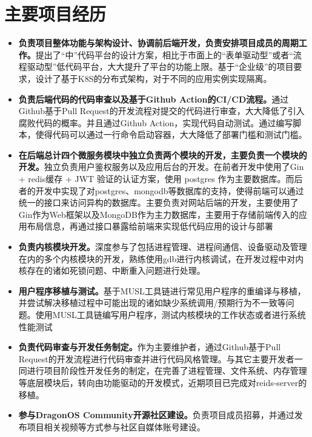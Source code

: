 \documentclass{resume}
\begin{document}
\section{主要项目经历}
\begin{itemize}
  \item \textbf{负责项目整体功能与架构设计、协调前后端开发，负责安排项目成员的周期工作。}提出了“中”代码平台的设计方案，相比于市面上的“表单驱动型”或者“流程驱动型”低代码平台，大大提升了平台的功能上限。基于“企业级”的项目要求，设计了基于K8S的分布式架构，对于不同的应用实例实现隔离。
  \item \textbf{负责后端代码的代码审查以及基于Github Action的CI/CD流程。}通过Github基于Pull Request的开发流程对提交的代码进行审查，大大降低了引入腐败代码的概率。并且通过Github Action，实现代码自动测试。通过编写脚本，使得代码可以通过一行命令启动容器，大大降低了部署门槛和测试门槛。
  \item \textbf{在后端总计四个微服务模块中独立负责两个模块的开发，主要负责一个模块的开发。}独立负责用户鉴权服务以及应用后台的开发。在前者开发中使用了Gin + redis缓存 + JWT 验证的认证方案，使用 postgres 作为主要数据库。而后者的开发中实现了对postgres、mongodb等数据库的支持，使得前端可以通过统一的接口来访问异构的数据库。主要负责对网站后端的开发，主要使用了Gin作为Web框架以及MongoDB作为主力数据库，主要用于存储前端传入的应用布局信息，再通过接口暴露给前端来实现低代码应用的设计与部署
\end{itemize}

\begin{itemize}
  \item \textbf{负责内核模块开发。}深度参与了包括进程管理、进程间通信、设备驱动及管理在内的多个内核模块的开发，熟练使用gdb进行内核调试，在开发过程中对内核存在的诸如死锁问题、中断重入问题进行处理。
  \item \textbf{用户程序移植与测试。}基于MUSL工具链进行常见用户程序的重编译与移植，并尝试解决移植过程中可能出现的诸如缺少系统调用/预期行为不一致等问题。使用MUSL工具链编写用户程序，测试内核模块的工作状态或者进行系统性能测试
  \item \textbf{负责代码审查与开发任务制定。}作为主要维护者，通过Github基于Pull Request的开发流程进行代码审查并进行代码风格管理。与其它主要开发者一同进行项目阶段性开发任务的制定，在完善了进程管理、文件系统、内存管理等底层模块后，转向由功能驱动的开发模式，近期项目已完成对reids-server的移植。
  \item \textbf{参与DragonOS Community开源社区建设。}负责项目成员招募，并通过发布项目相关视频等方式参与社区自媒体账号建设。
\end{itemize}
\end{document}
